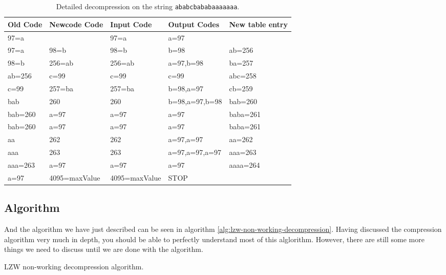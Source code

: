 \begin{refsection}
\begin{table}
  \centering
  \begin{tabular}{lllll}
    \toprule
    Old Code & Newcode Code & Input Code & Output Codes & New table entry \\
    \midrule

    97=a & & 97=a & a=97 & \\
    97=a & 98=b & 98=b & b=98 & ab=256 \\
    98=b & 256=ab & 256=ab & a=97,b=98 & ba=257 \\
    ab=256 & c=99 & c=99 & c=99  & abc=258 \\
    c=99 & 257=ba & 257=ba & b=98,a=97 & cb=259 \\
    bab & 260 & 260&b=98,a=97,b=98 &bab=260 \\
    bab=260 & a=97  & a=97 & a=97 & baba=261\\
    bab=260 & a=97 & a=97 & a=97 & baba=261\\

    aa & 262 & 262 & a=97,a=97 & aa=262 \\

    aaa & 263 & 263 & a=97,a=97,a=97 & aaa=263 \\

    aaa=263 & a=97 & a=97 & a=97 & aaaa=264  \\

    a=97 & 4095=maxValue & 4095=maxValue & STOP &  \\

    \bottomrule
  \end{tabular}
  \caption{Detailed \lzw decompression on the string \texttt{ababcbababaaaaaaa}.}
  \label{tab:lzw-dec-walkthru}
\end{table}

\subsection{Algorithm}

And the algorithm we have just described can be seen in algorithm
\ref{alg:lzw-non-working-decompression}. Having discussed the
compression algorithm very much in depth, you should be able to
perfectly understand most of this alglorithm. However, there are still
some more things we need to discuss until we are done with the \lzw
algorithm.

\begin{algorithm}[H]
  \caption{LZW non-working decompression algorithm.}
  \label{alg:lzw-working-decompression}
  \begin{algorithmic}[1]
    \State {}


\end{algorithmic}
\end{algorithm}
\end{refsection}
